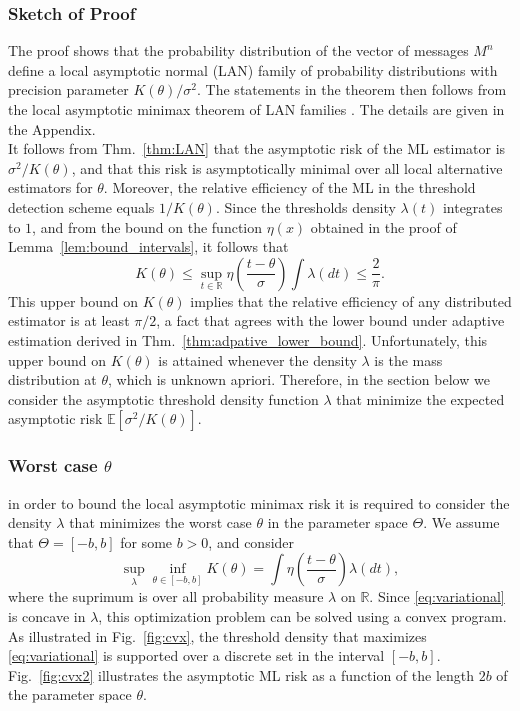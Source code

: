 \documentclass[letterpaper, conference]{IEEEtran}      %
\begin{document}
\subsubsection*{Sketch of Proof}
The proof shows that the probability distribution of the vector of messages $M^n$ define a local asymptotic normal (LAN) family of probability distributions with precision parameter $K(\theta)/\sigma^2$. The statements in the theorem then follows from the local asymptotic minimax theorem of LAN families \cite{van2000asymptotic}. The details are given in the Appendix.\\



It follows from Thm.~\ref{thm:LAN} that the asymptotic risk of the ML estimator is $\sigma^2/K(\theta)$, and that this risk is asymptotically minimal over all local alternative estimators for $\theta$. Moreover, the relative efficiency of the ML in the threshold detection scheme equals $1/K(\theta)$. Since the thresholds density $\lambda(t)$ integrates to $1$, and from the bound on the function $\eta(x)$ obtained in the proof of Lemma~\ref{lem:bound_intervals}, it follows that
\[
K(\theta) \leq \sup_{t\in \mathbb R} \eta \left( \frac{t-\theta}{\sigma} \right) \int  \lambda(dt)  \leq \frac{2}{\pi}.
\]
This upper bound on $K(\theta)$ implies that the relative efficiency of any distributed estimator is at least $\pi/2$, a fact that agrees with the lower bound under adaptive estimation derived in Thm.~\ref{thm:adpative_lower_bound}. Unfortunately, this upper bound on $K(\theta)$ is attained whenever the density $\lambda$ is the mass distribution at $\theta$, which is unknown apriori. Therefore, in the section below we consider the asymptotic threshold density function $\lambda$ that minimize the expected asymptotic risk $\mathbb E\left [\sigma^2/K(\theta) \right]$. 

\subsubsection{Worst case $\theta$} in order to bound the local asymptotic minimax risk it is required to consider the density $\lambda$ that minimizes the worst case $\theta$ in the parameter space $\Theta$. We assume that $\Theta = [-b,b]$ for some $b>0$, and consider 
\begin{equation} \label{eq:variational}
\sup_{\lambda} \inf_{\theta \in [-b,b]}  {K(\theta)} = \int \eta\left( \frac{t-\theta}{\sigma} \right) \lambda (dt),
\end{equation}
where the suprimum is over all probability measure $\lambda$ on $\mathbb R$. Since \eqref{eq:variational} is concave in $\lambda$, this optimization problem can be solved using a convex program. 
As illustrated in Fig.~\ref{fig:cvx}, the threshold density that maximizes \eqref{eq:variational} is supported over a discrete set in the interval $[-b,b]$. Fig.~\ref{fig:cvx2} illustrates the asymptotic ML risk as a function of the length $2b$ of the parameter space $\theta$. 
\end{document}

